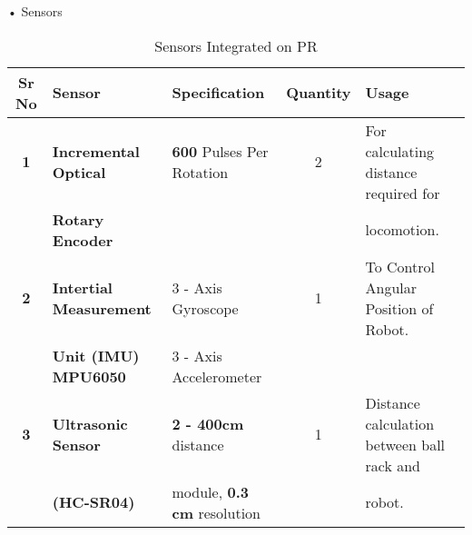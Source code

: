             • Sensors
            \begin{table}[h]
                \caption {Sensors Integrated on PR} \label{Sensors_PR}  \small
                \begin{tabular}{|c|l|l|c|l|}
                    \hline  \hline
                    \textbf{Sr No}  & \textbf{Sensor}                   & \textbf{Specification}                & \textbf{Quantity} & \textbf{Usage}                                      \\ \hline   \hline
                    \textbf{1}      & \textbf{Incremental Optical}      & \textbf{600} Pulses Per Rotation      &        2          & For calculating distance required for               \\
                                    & \textbf{Rotary Encoder}           &                                       &                   & locomotion.                                         \\ \hline         
                    \textbf{2}      & \textbf{Intertial Measurement}    & 3 - Axis Gyroscope                    &        1          & To Control Angular Position of  Robot.              \\ 
                                    & \textbf{Unit (IMU) MPU6050}       & 3 - Axis Accelerometer                &                   &                                                     \\ \hline                                     
                    \textbf{3}      & \textbf{Ultrasonic Sensor}        & \textbf{2 - 400cm} distance           &        1          & Distance calculation between ball rack and          \\ 
                                    & \textbf{(HC-SR04)}                & module, \textbf{0.3 cm} resolution    &                   & robot.                                              \\ \hline   \hline
                \end{tabular}
            \end{table}

